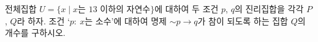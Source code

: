 전체집합 $U=\{x \mid x$는 $13$ 이하의 자연수$\}$에 대하여 두 조건 $p$, $q$의 진리집합을 각각 $P$, $Q$라 하자. 조건 ‘$p:\ x$는 소수’에 대하여 명제 $\sim p\longrightarrow q$가 참이 되도록 하는 집합 $Q$의 개수를 구하시오.
